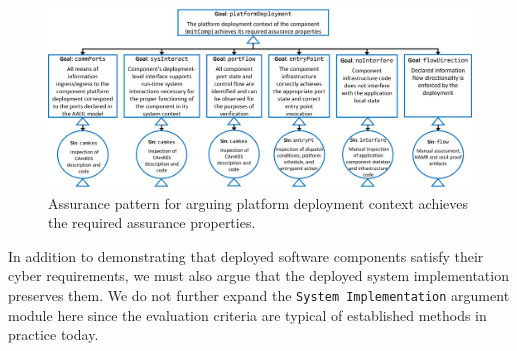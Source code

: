 \begin{figure}[h] 
	\centering 
	\includegraphics[width=\textwidth]{figs/platform-deployment-context-achieves-assurance-properties.png}
	\caption{Assurance pattern for arguing platform deployment context achieves the required assurance properties.}
	\label{fig:platform-deployment-context-achieves-assurance-properties} 
\end{figure}

In addition to demonstrating that deployed software components satisfy their cyber requirements, we must also argue that the deployed system implementation preserves them.  We do not further expand the \texttt{System Implementation} argument module here since the evaluation criteria are typical of established methods in practice today.
